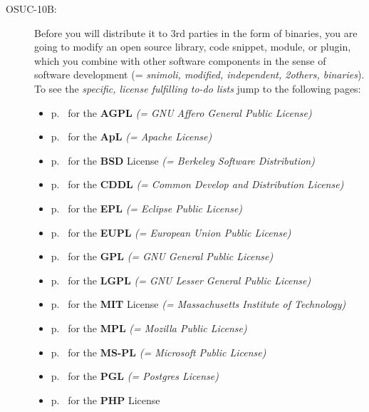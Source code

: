 \begin{description}
\item[OSUC-10B:]\label{OSUC-10B-DEF} Before you will distribute it to 3rd parties
in the form of binaries, you are going to modify an open source library, code
snippet, module, or plugin, which you combine with other software components in
the sense of software development (= \textit{snimoli, modified, independent,
2others, binaries}). To see the \textit{specific, license fulfilling to-do
lists} jump to the following pages:
  \begin{itemize}
    \item p.\ \pageref{OSUC-10B-AGPL} for the \textbf{AGPL}
      \textit{(= GNU Affero General Public License)} 
    \item p.\ \pageref{OSUC-10B-Apache20} for the \textbf{ApL}
      \textit{(= Apache License)}
    \item p.\ \pageref{OSUC-10B-BSD} for the \textbf{BSD} License
      \textit{(= Berkeley Software Distribution)}
    \item p.\ \pageref{OSUC-10B-CDDL} for the \textbf{CDDL}
      \textit{(= Common Develop and Distribution License)}  
    \item p.\ \pageref{OSUC-10B-EPL} for the \textbf{EPL}
      \textit{(= Eclipse Public License)}     
    \item p.\ \pageref{OSUC-10B-EUPL} for the \textbf{EUPL}
      \textit{(= European Union Public License)} 
    \item p.\ \pageref{OSUC-10B-GPL} for the \textbf{GPL}
       \textit{(= GNU General Public License)} 
    \item p.\ \pageref{OSUC-10B-LGPL} for the \textbf{LGPL}
      \textit{(= GNU Lesser General Public License)}           
    \item p.\ \pageref{OSUC-10B-MIT} for the \textbf{MIT} License
       \textit{(= Massachusetts Institute of Technology)} 
    \item p.\ \pageref{OSUC-10B-MPL} for the \textbf{MPL}
      \textit{(= Mozilla Public License)}     
    \item p.\ \pageref{OSUC-10B-MS-PL} for the \textbf{MS-PL}
      \textit{(= Microsoft Public License)} 
    \item p.\ \pageref{OSUC-10B-PGL} for the \textbf{PGL}
      \textit{(= Postgres License)} 
    \item p.\ \pageref{OSUC-10B-PHP} for the \textbf{PHP} License 
  \end{itemize}

\end{description}

%
